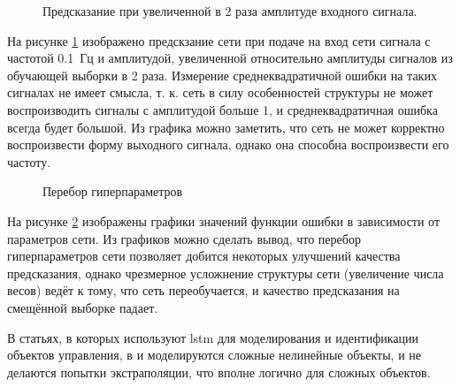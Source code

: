 \documentclass[12pt, oneside]{extbook}
\begin{document}
\begin{flushleft}
\begin{figure}[h]
\caption{Предсказание при увеличенной в 2 раза амплитуде входного сигнала.}
\label{fig:lstm_prediction_high_magnitude}
\end{figure}
На рисунке \ref{fig:lstm_prediction_high_magnitude} изображено предскзание сети при подаче на вход сети сигнала с частотой 0.1~Гц и амплитудой, увеличенной относительно амплитуды сигналов из обучающей выборки в 2 раза. Измерение среднеквадратичной ошибки на таких сигналах не имеет смысла, т. к. сеть в силу особенностей структуры не может воспроизводить сигналы с амплитудой больше 1, и среднеквадратичная ошибка всегда будет большой. Из графика можно заметить, что сеть не может корректно воспроизвести форму выходного сигнала, однако она способна воспроизвести его частоту. 
\par
\begin{figure}[!ht]
     \hfill
     \caption{Перебор гиперпараметров}
     \label{fig:lstm_search}
\end{figure}
На рисунке \ref{fig:lstm_search} изображены графики значений функции ошибки в зависимости от параметров сети. Из графиков можно сделать вывод, что перебор гиперпараметров сети позволяет добится некоторых улучшений качества предсказания, однако чрезмерное усложнение структуры сети (увеличение числа весов) ведёт к тому, что сеть переобучается, и качество предсказания на смещённой выборке падает. 
\par
В статьях, в которых используют lstm для моделирования и идентификации объектов управления, в \cite{deep_2017} и \cite{lstm_2017} моделируются сложные нелинейные объекты, и не делаются попытки экстраполяции, что вполне логично для сложных объектов.

\end{flushleft}
\end{document}

